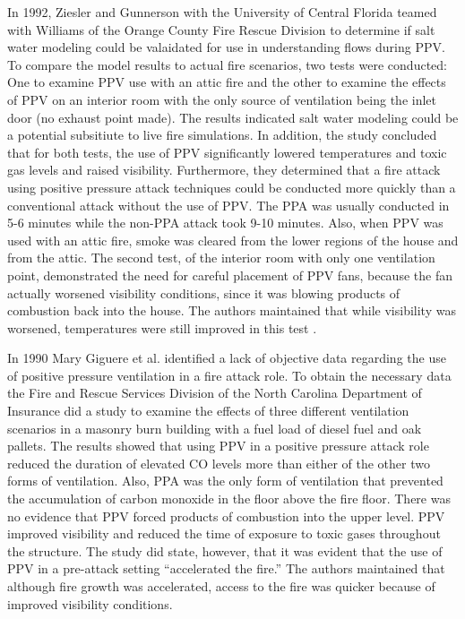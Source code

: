 \documentclass{article}
\begin{document}
In 1992, Ziesler and Gunnerson with the University of Central Florida teamed with Williams of the Orange County Fire Rescue Division to determine if salt water modeling could be valaidated for use in understanding flows during PPV. To compare the model results to actual fire scenarios, two tests were conducted: One to examine PPV use with an attic fire and the other to examine the effects of PPV on an interior room with the only source of ventilation being the inlet door (no exhaust point made). The results indicated salt water modeling could be a potential subsitiute to live fire simulations. In addition, the study concluded that for both tests, the use of PPV significantly lowered temperatures and toxic gas levels and raised visibility. Furthermore, they determined that a fire attack using positive pressure attack techniques could be conducted more quickly than a conventional attack without the use of PPV. The PPA was usually conducted in 5-6 minutes while the non-PPA attack took 9-10 minutes. Also, when PPV was used with an attic fire, smoke was cleared from the lower regions of the house and from the attic. The second test, of the interior room with only one ventilation point, demonstrated the need for careful placement of PPV fans, because the fan actually worsened visibility conditions, since it was blowing products of combustion back into the house. The authors maintained that while visibility was worsened, temperatures were still improved in this test \cite{AdvancesinPPV}.

In 1990 Mary Giguere et al. identified a lack of objective data regarding the use of positive pressure ventilation in a fire attack role. To obtain the necessary data the Fire and Rescue Services Division of the North Carolina Department of Insurance did a study to examine the effects of three different ventilation scenarios in a masonry burn building with a fuel load of diesel fuel and oak pallets. The results showed that using PPV in a positive pressure attack role reduced the duration of elevated CO levels more than either of the other two forms of ventilation. Also, PPA was the only form of ventilation that prevented the accumulation of carbon monoxide in the floor above the fire floor. There was no evidence that PPV forced products of combustion into the upper level. PPV improved visibility and reduced the time of exposure to toxic gases throughout the structure. The study did state, however, that it was evident that the use of PPV in a pre-attack setting “accelerated the fire.” The authors maintained that although fire growth was accelerated, access to the fire was quicker because of improved visibility conditions.\cite{GiguereToxicGas}
\end{document}
